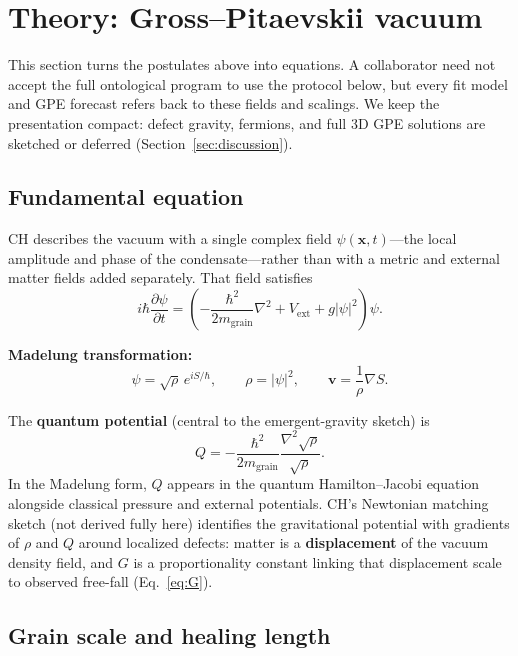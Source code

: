 \documentclass[11pt,a4paper]{article}
\begin{document}
\section{Theory: Gross--Pitaevskii vacuum}
\label{sec:theory}

This section turns the postulates above into equations.
A collaborator need not accept the full ontological program to use the protocol below, but every fit model and GPE forecast refers back to these fields and scalings.
We keep the presentation compact: defect gravity, fermions, and full 3D GPE solutions are sketched or deferred (Section~\ref{sec:discussion}).

\subsection{Fundamental equation}

CH describes the vacuum with a single complex field $\psi(\mathbf{x},t)$---the local amplitude and phase of the condensate---rather than with a metric and external matter fields added separately.
That field satisfies
\begin{equation}
  i\hbar \frac{\partial\psi}{\partial t}
  = \left(-\frac{\hbar^2}{2m_{\mathrm{grain}}}\nabla^2 + V_{\mathrm{ext}} + g|\psi|^2\right)\psi.
  \label{eq:gpe}
\end{equation}

\textbf{Madelung transformation:}
\begin{equation}
  \psi = \sqrt{\rho}\, e^{iS/\hbar}, \qquad
  \rho = |\psi|^2, \qquad
  \mathbf{v} = \frac{1}{\rho}\nabla S.
  \label{eq:madelung}
\end{equation}

The \textbf{quantum potential} (central to the emergent-gravity sketch) is
\begin{equation}
  Q = -\frac{\hbar^2}{2m_{\mathrm{grain}}}\frac{\nabla^2\sqrt{\rho}}{\sqrt{\rho}}.
  \label{eq:quantum-potential}
\end{equation}
In the Madelung form, $Q$ appears in the quantum Hamilton--Jacobi equation alongside classical pressure and external potentials.
CH's Newtonian matching sketch (not derived fully here) identifies the gravitational potential with gradients of $\rho$ and $Q$ around localized defects: matter is a \textbf{displacement} of the vacuum density field, and $G$ is a proportionality constant linking that displacement scale to observed free-fall (Eq.~\ref{eq:G}).

\subsection{Grain scale and healing length}
\end{document}
